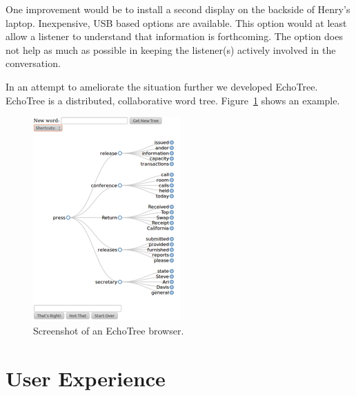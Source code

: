 \documentclass{sigchi}
\begin{document}
One improvement would be to install a second display on the backside
of Henry's laptop. Inexpensive, USB based options are available. This
option would at least allow a listener to understand that information
is forthcoming. The option does not help as much as possible in
keeping the listener(s) actively involved in the conversation. 

In an attempt to ameliorate the situation further we developed
EchoTree. EchoTree is a distributed, collaborative word
tree. Figure~\ref{fig:echoTree} shows an example.
\begin{figure}
   \centering
   \includegraphics[width=\columnwidth]{Figs/echoTreeScreenshotSmall.png}
   \caption{Screenshot of an EchoTree browser.}
   \label{fig:echoTree}
\end{figure}

\section{User Experience}
\end{document}
